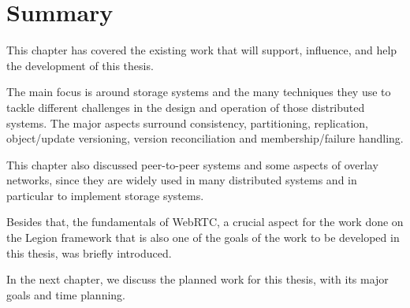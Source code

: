 \section{Summary}
\label{sec:summary}
This chapter has covered the existing work that will support, influence, and help the development of this thesis.\par
	The main focus is around storage systems and the many techniques they use to tackle different challenges in the design and operation of those distributed systems. The major aspects surround consistency, partitioning, replication, object/update versioning, version reconciliation and membership/failure handling.\par
	This chapter also discussed peer-to-peer systems and some aspects of overlay networks, since they are widely used in many distributed systems and in particular to implement storage systems.\par
	Besides that, the fundamentals of WebRTC, a crucial aspect for the work done on the Legion framework that is also one of the goals of the work to be developed in this thesis, was briefly introduced.\par
	In the next chapter, we discuss the planned work for this thesis, with its major goals and time planning.
